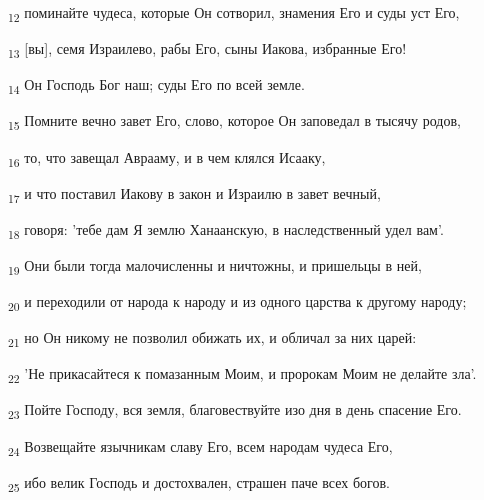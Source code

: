 \begin{tcolorbox}
\textsubscript{12} поминайте чудеса, которые Он сотворил, знамения Его и суды уст Его,
\end{tcolorbox}
\begin{tcolorbox}
\textsubscript{13} [вы], семя Израилево, рабы Его, сыны Иакова, избранные Его!
\end{tcolorbox}
\begin{tcolorbox}
\textsubscript{14} Он Господь Бог наш; суды Его по всей земле.
\end{tcolorbox}
\begin{tcolorbox}
\textsubscript{15} Помните вечно завет Его, слово, которое Он заповедал в тысячу родов,
\end{tcolorbox}
\begin{tcolorbox}
\textsubscript{16} то, что завещал Аврааму, и в чем клялся Исааку,
\end{tcolorbox}
\begin{tcolorbox}
\textsubscript{17} и что поставил Иакову в закон и Израилю в завет вечный,
\end{tcolorbox}
\begin{tcolorbox}
\textsubscript{18} говоря: 'тебе дам Я землю Ханаанскую, в наследственный удел вам'.
\end{tcolorbox}
\begin{tcolorbox}
\textsubscript{19} Они были тогда малочисленны и ничтожны, и пришельцы в ней,
\end{tcolorbox}
\begin{tcolorbox}
\textsubscript{20} и переходили от народа к народу и из одного царства к другому народу;
\end{tcolorbox}
\begin{tcolorbox}
\textsubscript{21} но Он никому не позволил обижать их, и обличал за них царей:
\end{tcolorbox}
\begin{tcolorbox}
\textsubscript{22} 'Не прикасайтеся к помазанным Моим, и пророкам Моим не делайте зла'.
\end{tcolorbox}
\begin{tcolorbox}
\textsubscript{23} Пойте Господу, вся земля, благовествуйте изо дня в день спасение Его.
\end{tcolorbox}
\begin{tcolorbox}
\textsubscript{24} Возвещайте язычникам славу Его, всем народам чудеса Его,
\end{tcolorbox}
\begin{tcolorbox}
\textsubscript{25} ибо велик Господь и достохвален, страшен паче всех богов.
\end{tcolorbox}
